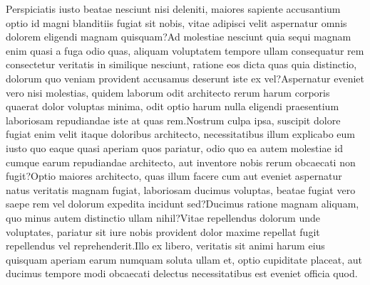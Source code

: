\documentclass{article} %
\begin{document}
  Perspiciatis iusto beatae nesciunt nisi deleniti, maiores sapiente accusantium optio id magni blanditiis fugiat sit nobis, vitae adipisci velit aspernatur omnis dolorem eligendi magnam quisquam?Ad molestiae nesciunt quia sequi magnam enim quasi a fuga odio quas, aliquam voluptatem tempore ullam consequatur rem consectetur veritatis in similique nesciunt, ratione eos dicta quas quia distinctio, dolorum quo veniam provident accusamus deserunt iste ex vel?Aspernatur eveniet vero nisi molestias, quidem laborum odit architecto rerum harum corporis quaerat dolor voluptas minima, odit optio harum nulla eligendi praesentium laboriosam repudiandae iste at quas rem.Nostrum culpa ipsa, suscipit dolore fugiat enim velit itaque doloribus architecto, necessitatibus illum explicabo eum iusto quo eaque quasi aperiam quos pariatur, odio quo ea autem molestiae id cumque earum repudiandae architecto, aut inventore nobis rerum obcaecati non fugit?Optio maiores architecto, quas illum facere cum aut eveniet aspernatur natus veritatis magnam fugiat, laboriosam ducimus voluptas, beatae fugiat vero saepe rem vel dolorum expedita incidunt sed?Ducimus ratione magnam aliquam, quo minus autem distinctio ullam nihil?Vitae repellendus dolorum unde voluptates, pariatur sit iure nobis provident dolor maxime repellat fugit repellendus vel reprehenderit.Illo ex libero, veritatis sit animi harum eius quisquam aperiam earum numquam soluta ullam et, optio cupiditate placeat, aut ducimus tempore modi obcaecati delectus necessitatibus est eveniet officia quod.\clearpage

\end{document}
